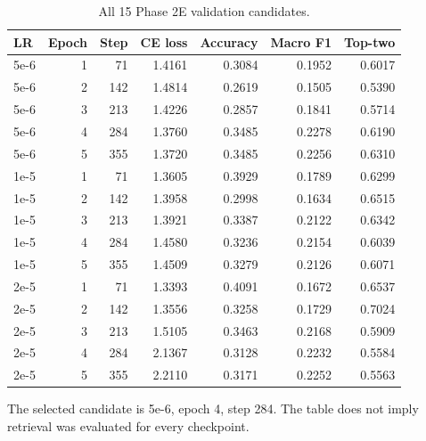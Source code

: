 \begin{table}[htbp]
\centering\small
\caption{All 15 Phase 2E validation candidates.}
\label{tab:lrgrid}
\begin{tabular}{@{}lrrrrrr@{}}
\toprule
LR & Epoch & Step & CE loss & Accuracy & Macro F1 & Top-two\\
\midrule
5e-6 & 1 & 71 & 1.4161 & 0.3084 & 0.1952 & 0.6017\\
5e-6 & 2 & 142 & 1.4814 & 0.2619 & 0.1505 & 0.5390\\
5e-6 & 3 & 213 & 1.4226 & 0.2857 & 0.1841 & 0.5714\\
5e-6 & 4 & 284 & 1.3760 & 0.3485 & 0.2278 & 0.6190\\
5e-6 & 5 & 355 & 1.3720 & 0.3485 & 0.2256 & 0.6310\\
1e-5 & 1 & 71 & 1.3605 & 0.3929 & 0.1789 & 0.6299\\
1e-5 & 2 & 142 & 1.3958 & 0.2998 & 0.1634 & 0.6515\\
1e-5 & 3 & 213 & 1.3921 & 0.3387 & 0.2122 & 0.6342\\
1e-5 & 4 & 284 & 1.4580 & 0.3236 & 0.2154 & 0.6039\\
1e-5 & 5 & 355 & 1.4509 & 0.3279 & 0.2126 & 0.6071\\
2e-5 & 1 & 71 & 1.3393 & 0.4091 & 0.1672 & 0.6537\\
2e-5 & 2 & 142 & 1.3556 & 0.3258 & 0.1729 & 0.7024\\
2e-5 & 3 & 213 & 1.5105 & 0.3463 & 0.2168 & 0.5909\\
2e-5 & 4 & 284 & 2.1367 & 0.3128 & 0.2232 & 0.5584\\
2e-5 & 5 & 355 & 2.2110 & 0.3171 & 0.2252 & 0.5563\\
\bottomrule
\end{tabular}
\par\smallskip\begin{minipage}{\textwidth}\footnotesize The selected candidate is 5e-6, epoch 4, step 284. The table does not imply retrieval was evaluated for every checkpoint.\end{minipage}
\end{table}
